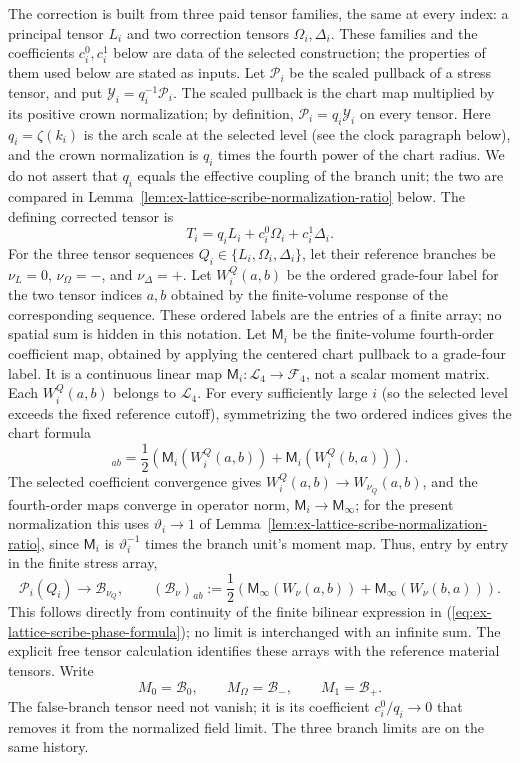 The correction is built from three paid tensor families, the same at
every index: a principal tensor $L_i$ and two correction tensors
$\Omega_i,\Delta_i$. These families and the coefficients $c_i^0,c_i^1$
below are data of the selected construction; the properties of them used
below are stated as inputs. Let
$\mathcal P_i$ be the scaled pullback of a stress tensor, and put
$\mathcal Y_i=q_i^{-1}\mathcal P_i$. The scaled pullback is the
chart map multiplied by its positive crown normalization; by definition,
$\mathcal P_i=q_i\mathcal Y_i$ on every tensor. Here
$q_i=\zeta(k_i)$ is the arch scale at the selected level (see the clock
paragraph below), and the crown normalization is $q_i$ times the fourth
power of the chart radius. We do not assert that $q_i$ equals the
effective coupling of the branch unit; the two are compared in
Lemma~\ref{lem:ex-lattice-scribe-normalization-ratio} below. The defining corrected tensor is
\begin{equation}
 T_i=q_iL_i+c_i^0\Omega_i+c_i^1\Delta_i.
 \label{eq:ex-lattice-scribe-corrected-tensor}
\end{equation}
For the three tensor sequences $Q_i\in\{L_i,\Omega_i,\Delta_i\}$, let
their reference branches be $\nu_L=0$, $\nu_\Omega=-$, and
$\nu_\Delta=+$. Let $W_i^Q(a,b)$ be the ordered grade-four label for the
two tensor indices $a,b$ obtained by the finite-volume response of the
corresponding sequence. These ordered
labels are the entries of a finite array; no spatial sum is hidden in this
notation. Let $\mathsf M_i$ be the finite-volume fourth-order coefficient
map, obtained by applying the centered chart pullback to a grade-four label.
It is a continuous linear map
$\mathsf M_i:\mathcal L_4\to\mathcal F_4$, not a scalar moment matrix.
Each $W_i^Q(a,b)$ belongs to $\mathcal L_4$. For every sufficiently large
$i$ (so the selected level exceeds the fixed reference cutoff), symmetrizing
the two ordered indices gives the chart formula
\begin{equation}
 [\mathcal P_i(Q_i)]_{ab}=
 \frac12\left(\mathsf M_i(W_i^Q(a,b))+\mathsf M_i(W_i^Q(b,a))\right).
 \label{eq:ex-lattice-scribe-phase-formula}
\end{equation}
The selected coefficient convergence gives $W_i^Q(a,b)\to
W_{\nu_Q}(a,b)$, and the fourth-order maps converge in operator norm,
$\mathsf M_i\to\mathsf M_\infty$; for the present normalization this
uses $\vartheta_i\to1$ of
Lemma~\ref{lem:ex-lattice-scribe-normalization-ratio}, since $\mathsf M_i$
is $\vartheta_i^{-1}$ times the branch unit's moment map. Thus, entry by
entry in the finite
stress array,
\[
 \mathcal P_i(Q_i)\longrightarrow\mathcal B_{\nu_Q},\qquad
 (\mathcal B_\nu)_{ab}:=
 \frac12\left(\mathsf M_\infty(W_\nu(a,b))+
                \mathsf M_\infty(W_\nu(b,a))\right).
\]
This follows directly from continuity of the finite bilinear expression in
(\ref{eq:ex-lattice-scribe-phase-formula}); no limit is interchanged with
an infinite sum. The explicit free tensor calculation identifies these
arrays with the reference material tensors. Write
\[
 M_0=\mathcal B_0,\qquad M_\Omega=\mathcal B_-,\qquad M_1=\mathcal B_+.
\]
The false-branch tensor need not vanish; it is its coefficient
$c_i^0/q_i\to0$ that removes it from the normalized field limit. The three
branch limits are on the same history.

